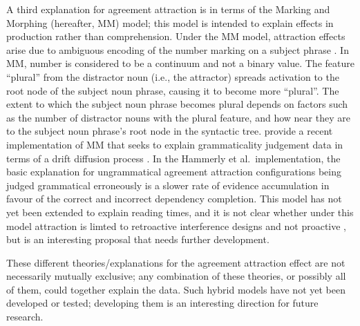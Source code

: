 \documentclass{cambridge7A}\usepackage[]{graphicx}\usepackage[]{color}
\begin{document}
A third explanation for agreement attraction is in terms of the  Marking and Morphing (hereafter, MM) model; this model is intended to explain effects in production rather than comprehension.  Under the MM model, attraction effects arise due to ambiguous encoding of the number marking on a subject phrase \citep[e.g.,][]{EberhardCuttingBock2005}. In MM, number is considered to be a continuum and not a binary value. The feature ``plural'' from the distractor noun (i.e., the attractor) spreads activation to the root node of the subject noun phrase, causing it to become more ``plural''. The extent to which the subject noun phrase becomes plural depends on factors such as the number of distractor nouns with the plural feature, and how near they are to the subject noun phrase's root node in the syntactic tree. \cite{hammerly2019grammaticality} provide a recent implementation of MM that seeks to explain grammaticality judgement data in terms of a  drift diffusion process \citep{Ratcliff1978}. In the Hammerly  et al.\ implementation, the basic explanation for ungrammatical agreement attraction configurations being judged grammatical erroneously is a slower rate of evidence accumulation in favour of the correct and incorrect dependency completion. This model has not yet been extended to explain reading times,  and it is not clear whether under this model attraction is limted to retroactive interference designs and not proactive \citep{ALV2020},  but is an interesting proposal that needs further development.

 These different theories/explanations for the agreement attraction effect are not necessarily mutually exclusive; any combination of these theories, or possibly all of them, could together explain the data. Such hybrid models have not yet been developed or tested; developing them is an interesting direction for future research.
  
\end{document}
